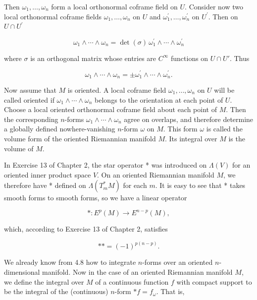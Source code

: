 Then $\omega_{1}, \ldots, \omega_{n}$ form a local orthonormal coframe field on $U$. Consider now two local orthonormal coframe fields $\omega_{1}, \ldots, \omega_{n}$ on $U$ and $\omega_{1}^{\prime}, \ldots, \omega_{n}^{\prime}$ on $U^{\prime}$. Then on $U \cap U^{\prime}$ 

\begin{equation}
\tag{3}\label{eq:4.10:3}
\omega_{1}\wedge\cdots\wedge\omega_{n}=\det(\sigma)\,\omega_{1}^{\prime}\wedge\cdots\wedge\omega_{n}^{\prime}
\end{equation}

where  $ \sigma $ is an orthogonal matrix whose entries are  $ C^{\infty} $ functions on  $ U \cap U' $. Thus

\begin{equation}
\tag{4}\label{eq:4.10:4}
\omega_{1}\wedge\cdots\wedge\omega_{n}=\pm\omega_{1}^{\prime}\wedge\cdots\wedge\omega_{n}^{\prime}.
\end{equation}

Now assume that $M$ is oriented. A local coframe field $\omega_1, \ldots, \omega_n$ on $U$ will be called oriented if $\omega_1 \wedge \cdots \wedge \omega_n$ belongs to the orientation at each point of $U$. Choose a local oriented orthonormal coframe field about each point of $M$. Then the corresponding $n$-forms $\omega_1 \wedge \cdots \wedge \omega_n$ agree on overlaps, and therefore determine a globally defined nowhere-vanishing $n$-form $\omega$ on $M$. This form $\omega$ is called the volume form of the oriented Riemannian manifold $M$. Its integral over $M$ is the volume of $M$. 

In Exercise 13 of Chapter 2, the star operator * was introduced on $\Lambda(V)$ for an oriented inner product space $V$. On an oriented Riemannian manifold $M$, we therefore have * defined on $\Lambda(T_{m}^{*} M)$ for each $m$. It is easy to see that * takes smooth forms to smooth forms, so we have a linear operator

\begin{equation}
\tag{5}\label{eq:4.10:5}
*:E^{p}(M)\to E^{n-p}(M),
\end{equation}

which, according to Exercise 13 of Chapter 2, satisfies

\begin{equation}
\tag{6}\label{eq:4.10:6}
**=(-1)^{p(n-p)}.
\end{equation}

We already know from 4.8 how to integrate $n$-forms over an oriented $n$-dimensional manifold. Now in the case of an oriented Riemannian manifold $M$, we define the integral over $M$ of a continuous function $f$ with compact support to be the integral of the (continuous) $n$-form $*f = f_\omega$. That is,

